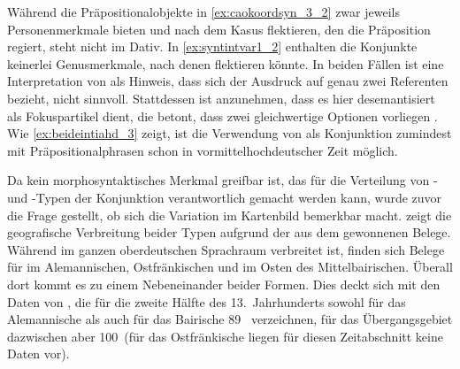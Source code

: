 Während die Präpositionalobjekte in \cref{ex:caokoordsyn_3_2} zwar jeweils
Personenmerkmale bieten und nach dem Kasus flektieren, den die Präposition
regiert, steht  nicht im Dativ.
In \cref{ex:syntintvar1_2} enthalten die Konjunkte keinerlei Genusmerkmale,
nach denen  flektieren könnte. In beiden Fällen ist eine
Interpretation von  als Hinweis, dass sich der Ausdruck auf genau
zwei Referenten bezieht, nicht sinnvoll. Stattdessen ist anzunehmen, dass es
hier desemantisiert als Fokuspartikel dient, die betont, dass zwei
gleichwertige Optionen vorliegen \autocite[425--428]{johannessen2005}. Wie
\cref{ex:beideintiahd_3} zeigt, ist die Verwendung von  als
Konjunktion zumindest mit Präpositionalphrasen schon in vormittelhochdeutscher
Zeit möglich.

Da kein morphosyntaktisches Merkmal greifbar ist, das für die Verteilung von
- und -Typen der Konjunktion verantwortlich gemacht
werden kann, wurde zuvor die Frage gestellt, ob sich die Variation im
Kartenbild bemerkbar macht.  zeigt die geografische
Verbreitung beider Typen aufgrund der aus dem \CAO{} gewonnenen
Belege. Während  im ganzen oberdeutschen Sprachraum verbreitet
ist, finden sich Belege für 
im Alemannischen, Ostfränkischen und im Osten des Mittelbairischen. Überall
dort kommt es zu einem Nebeneinander beider Formen.
%
Dies deckt sich mit den Daten von \citet[627]{ksw2}, die für die zweite Hälfte
des 13.~Jahrhunderts sowohl für das Alemannische als auch für das Bairische
89\pct\  verzeichnen, für das Übergangsgebiet dazwischen aber
100\pct\ (für das Ostfränkische liegen für diesen Zeitabschnitt keine Daten
vor).


